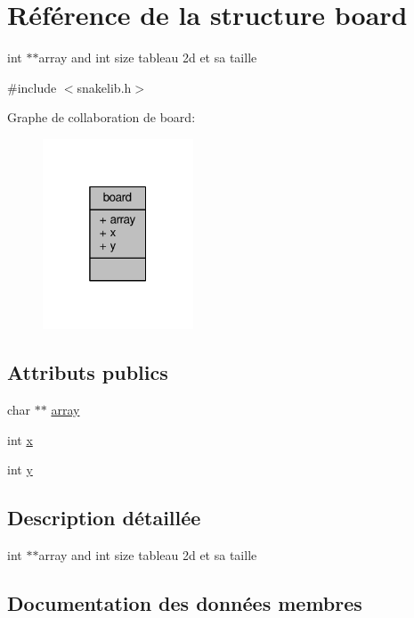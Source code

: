 \hypertarget{structboard}{}\section{Référence de la structure board}
\label{structboard}


int $\ast$$\ast$array and int size tableau 2d et sa taille  




{\ttfamily \#include $<$snakelib.\+h$>$}



Graphe de collaboration de board\+:\nopagebreak
\begin{figure}[H]
\begin{center}
\leavevmode
\includegraphics[width=127pt]{structboard__coll__graph}
\end{center}
\end{figure}
\subsection*{Attributs publics}
\begin{DoxyCompactItemize}
\item 
char $\ast$$\ast$ \hyperlink{structboard_a1d1e3a5155ec051a1e5a5e2d9de30e86}{array}
\item 
int \hyperlink{structboard_a45ad83890aed4b92ef175f0eb13cd1f3}{x}
\item 
int \hyperlink{structboard_a0a1685edc20c5b97527ccd4027d5f8eb}{y}
\end{DoxyCompactItemize}


\subsection{Description détaillée}
int $\ast$$\ast$array and int size tableau 2d et sa taille 

\subsection{Documentation des données membres}
